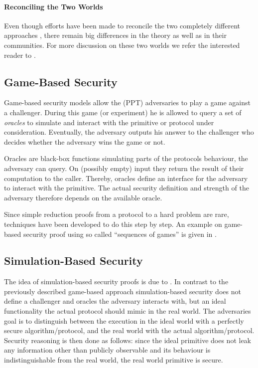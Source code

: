 \paragraph{Reconciling the Two Worlds}
Even though efforts have been made to reconcile the two completely different approaches \cite{Abadi2002,Herzog2005}, there remain big differences in the theory as well as in their communities.
For more discussion on these two worlds we refer the interested reader to \cite{cortier2011survey}.

\subsection{Game-Based Security}
Game-based security models allow the (\ac{PPT}) adversaries to play a game against a challenger.
During this game (or experiment) he is allowed to query a set of \emph{oracles} to simulate and interact with the primitive or protocol under consideration.
Eventually, the adversary outputs his answer to the challenger who decides whether the adversary wins the game or not.

Oracles are black-box functions simulating parts of the protocols behaviour, the adversary can query.
On (possibly empty) input they return the result of their computation to the caller.
Thereby, oracles define an interface for the adversary to interact with the primitive.
The actual security definition and strength of the adversary therefore depends on the available oracle.

Since simple reduction proofs from a protocol to a hard problem are rare, techniques have been developed to do this step by step.
An example on game-based security proof using so called ``sequences of games'' is given in \cite{Shoup2004}.

\subsection{Simulation-Based Security}
The idea of simulation-based security proofs is due to \citeauthor{Goldreich87} \cite{Goldreich87} \citeyear{Goldreich87}.
In contrast to the previously described game-based approach simulation-based security does not define a challenger and oracles the adversary interacts with, but an ideal functionality the actual protocol should mimic in the real world.
The adversaries goal is to distinguish between the execution in the ideal world with a perfectly secure algorithm/protocol, and the real world with the actual algorithm/protocol.
Security reasoning is then done as follows: since the ideal primitive does not leak any information other than publicly observable and its behaviour is indistinguishable from the real world, the real world primitive is secure.

